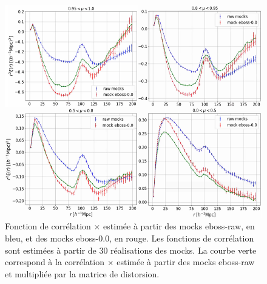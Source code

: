 \begin{figure}
  \centering
  \includegraphics[scale=0.5]{dmat_effect}
  \caption{Fonction de corrélation \lya{}$\times$\lya{} estimée à partir des mocks eboss-raw, en bleu, et des mocks eboss-0.0, en rouge. Les fonctions de corrélation sont estimées à partir de 30 réalisations des mocks. La courbe verte correspond à la corrélation \lya{}$\times$\lya{} estimée à partir des mocks eboss-raw et multipliée par la matrice de distorsion.}
  \label{fig:dmat_effect}
\end{figure}

